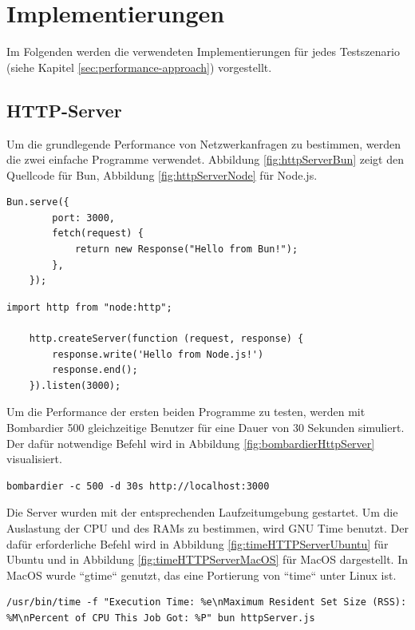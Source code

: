 \section{Implementierungen} \label{sec:performance-implementations}
Im Folgenden werden die verwendeten Implementierungen für jedes Testszenario (siehe Kapitel \ref{sec:performance-approach}) vorgestellt.

\subsection{HTTP-Server} \label{subsec:httpServer}
Um die grundlegende Performance von Netzwerkanfragen zu bestimmen, werden die zwei einfache Programme verwendet. Abbildung  \ref{fig:httpServerBun} zeigt den Quellcode für Bun, Abbildung \ref{fig:httpServerNode} für Node.js.

\begin{lstlisting}[caption={HTTP-Server Bun},label={fig:httpServerBun}]
	Bun.serve({
		port: 3000,
		fetch(request) {
			return new Response("Hello from Bun!");
		},
	});
\end{lstlisting}

\begin{lstlisting}[caption={HTTP-Server Node.js},label={fig:httpServerNode}]
	import http from "node:http";
	
	http.createServer(function (request, response) {
		response.write('Hello from Node.js!')
		response.end();
	}).listen(3000);
\end{lstlisting}

\noindent
Um die Performance der ersten beiden Programme zu testen, werden mit Bombardier 500 gleichzeitige Benutzer für eine Dauer von 30 Sekunden simuliert. Der dafür notwendige Befehl wird in Abbildung \ref{fig:bombardierHttpServer} visualisiert.
\begin{lstlisting}[caption={Bombardier HTTP-Server},label={fig:bombardierHttpServer}]
	bombardier -c 500 -d 30s http://localhost:3000
\end{lstlisting}

\noindent
Die Server wurden mit der entsprechenden Laufzeitumgebung gestartet. Um die Auslastung der CPU und des RAMs zu bestimmen, wird GNU Time benutzt. Der dafür erforderliche Befehl wird in Abbildung \ref{fig:timeHTTPServerUbuntu} für Ubuntu und in Abbildung \ref{fig:timeHTTPServerMacOS} für MacOS dargestellt. In MacOS wurde ``gtime`` genutzt, das eine Portierung von ``time`` unter Linux ist.

\begin{lstlisting}[caption={Bombardier HTTP-Server},label={fig:timeHTTPServerUbuntu}]
	/usr/bin/time -f "Execution Time: %e\nMaximum Resident Set Size (RSS): %M\nPercent of CPU This Job Got: %P" bun httpServer.js
\end{lstlisting}

